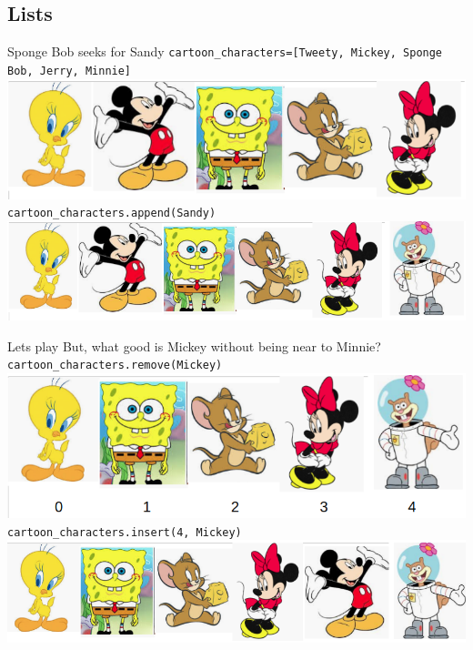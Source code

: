     \subsection{Lists}
    \begin{frame}{Sponge Bob seeks for Sandy}
        \pause
        \texttt{cartoon\_characters=[\textquotesingle Tweety\textquotesingle , \textquotesingle Mickey\textquotesingle , \textquotesingle Sponge Bob\textquotesingle , \textquotesingle Jerry\textquotesingle , \textquotesingle Minnie\textquotesingle ]}\\
        \includegraphics[width=.80\textwidth]{images/list_cartoons/list0.png}   
        \pause
        \texttt{cartoon\_characters.append(\textquotesingle Sandy\textquotesingle )}\\
        \pause
        \includegraphics[width=.95\textwidth]{images/list_cartoons/list_after_append.png}       
    \end{frame}

    \begin{frame} {Let\textquotesingle s play}
        But, what good is Mickey without being near to Minnie?\\
        \pause
        \texttt{cartoon\_characters.remove(\textquotesingle Mickey\textquotesingle )}\\
        \pause
        \includegraphics[width=.77\textwidth]{images/list_cartoons/list_after_remove.png}   
        \pause
        \texttt{cartoon\_characters.insert(4, \textquotesingle Mickey\textquotesingle )}\\
        \pause
        \includegraphics[width=.89\textwidth]{images/list_cartoons/list_after_insert.png}       
    \end{frame}

